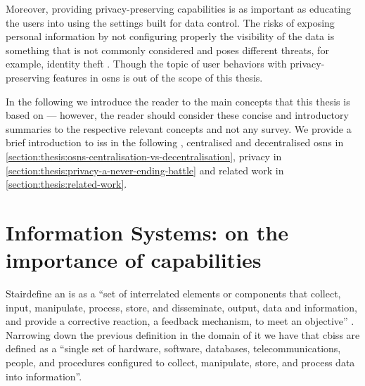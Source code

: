 Moreover, providing privacy-preserving capabilities is as important as educating 
the users into using the settings built for data control. The risks of exposing 
personal information by not configuring properly the visibility of the data is something 
that is not commonly considered and poses different threats, for example, identity 
theft \cite{GrossAH05, BrandtzaegLS10}. Though the topic of user behaviors with 
privacy-preserving features in \acp{osn} is out of the scope of this thesis.

In the following 
we introduce the reader to the main concepts that this thesis is based on --- however,
the reader should consider these  
concise and introductory summaries to the respective relevant concepts and not any 
survey. 
We provide a brief introduction to \acp{is} in the following ,
centralised and decentralised \acp{osn} in \cref{section:thesis:osns-centralisation-vs-decentralisation}, 
privacy in \cref{section:thesis:privacy-a-never-ending-battle} and related work 
in \cref{section:thesis:related-work}.

\section{Information Systems: on the importance of capabilities}
    \label{section:thesis:information-systems-on-the-importance-of-capabilities}

Stair\etal define an \ac{is} as a ``set of interrelated elements or components that 
collect, input, manipulate, process, store, and disseminate, output, data and information, 
and provide a corrective reaction, a feedback mechanism, to meet an objective'' 
\cite{StairR15}. Narrowing down the previous definition in the domain of \ac{it} 
we have that \acp{cbis} are defined as a ``single set of hardware, software, databases, 
telecommunications, people, and procedures configured to collect, manipulate, store, 
and process data into information''. 

